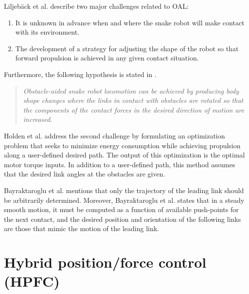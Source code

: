 Liljebäck et al. \cite{liljeback2012snake} describe two major challenges related to OAL:
\begin{enumerate}
  \item It is unknown in advance when and where the snake robot will make contact with its environment.
  \item The development of a strategy for adjusting the shape of the robot so that forward propulsion is achieved in any given contact situation.
\end{enumerate}
Furthermore, the following hypothesis is stated in \cite{liljeback2012snake}.
\begin{quote}
   \textit{ Obstacle-aided snake robot locomotion can be achieved by producing body shape changes where the links in contact with obstacles are rotated so that the components of the contact forces in the desired direction of motion are increased.}
\end{quote}

Holden et al. \cite{holden2014optimal} address the second challenge by formulating an optimization problem that seeks to minimize energy consumption while achieving propulsion along a user-defined desired path. The output of this optimization is the optimal motor torque inputs. In addition to a user-defined path, this method assumes that the desired link angles at the obstacles are given.

Bayraktaroglu et al. \cite{bayraktaroglu2004understanding} mentions that only the trajectory of the leading link should be arbitrarily determined. Moreover, Bayraktaroglu et al. \cite{bayraktaroglu2004understanding} states that in a steady smooth motion, it must be computed as a function of available push-points for the next contact, and the desired position and orientation of the following links are those that mimic the motion of the leading link.




\section{Hybrid position/force control (HPFC)}

